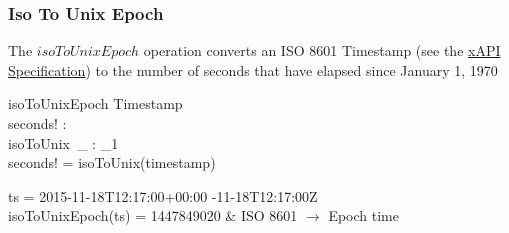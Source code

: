 \documentclass[../../main.tex]{subfiles}
\begin{document}
\subsubsection{Iso To Unix Epoch}
The $isoToUnixEpoch$ operation converts an ISO 8601 Timestamp (see the \href{https://github.com/adlnet/xAPI-Spec/blob/master/xAPI-Data.md#timestamps}{xAPI Specification})
to the number of seconds that have elapsed since January 1, 1970
\begin{schema}{isoToUnixEpoch}
  Timestamp \\
  seconds! : \nat \\
  isoToUnix~\_ : \finset_1 \fun \nat \\
  \where
  seconds! = isoToUnix(timestamp)
\end{schema}
\begin{argue}
  ts = 2015-11-18T12:17:00+00:00 -11-18T12:17:00Z \\
  isoToUnixEpoch(ts) =  1447849020 & ISO 8601 $\to$ Epoch time
\end{argue}
\end{document}
